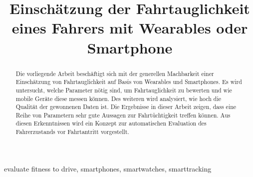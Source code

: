 \documentclass[conference]{IEEEtran}
\begin{document}
\title{Einschätzung der Fahrtauglichkeit eines Fahrers mit Wearables oder Smartphone}

\author{
}

\maketitle

\begin{abstract}
Die vorliegende Arbeit beschäftigt sich mit der generellen Machbarkeit einer Einschätzung von Fahrtauglichkeit auf Basis von Wearables und Smartphones. Es wird untersucht, welche Parameter nötig sind, um Fahrtauglichkeit zu bewerten und wie mobile Geräte diese messen können. Des weiteren wird analysiert, wie hoch die Qualität der gewonnenen Daten ist. Die Ergebnisse in dieser Arbeit zeigen, dass eine Reihe von Parametern sehr gute Aussagen zur Fahrtüchtigkeit treffen können. Aus diesen Erkenntnissen wird ein Konzept zur automatischen Evaluation des Fahrerzustands vor Fahrtantritt vorgestellt.
\end{abstract}

\begin{IEEEkeywords}
evaluate fitness to drive, smartphones, smartwatches, smarttracking
\end{IEEEkeywords}








\end{document}
